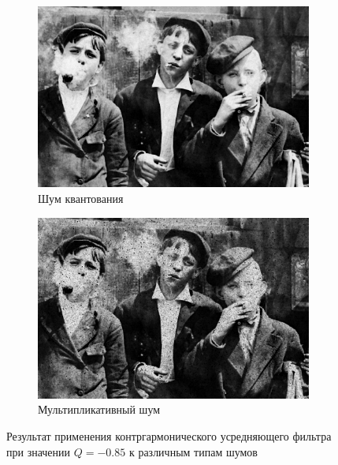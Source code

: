 \begin{figure}[ht]
\begin{subfigure}[b]{0.5\linewidth}
      \includegraphics[width=0.95\linewidth]{../Contraharmonic_Filter/Contraharmonic_Poisson_noise_(m,n=(3,_3),q=-0.85).jpg} 
      \caption{Шум квантования} 
      \label{contraharmonic_-0.85:e}
    \end{subfigure}%
    \begin{subfigure}[b]{0.5\linewidth}
        \centering
        \includegraphics[width=0.95\linewidth]{../Contraharmonic_Filter/Contraharmonic_Speckle_noise_(m,n=(3,_3),q=-0.85).jpg} 
        \caption{Мультипликативный шум} 
        \label{contraharmonic_-0.85:f} 
    \end{subfigure} 
    \caption{Результат применения контргармонического усредняющего фильтра при значении $Q = -0.85$ к различным типам шумов}
    \label{img:contraharmonic_-0.85} 
  \end{figure}

